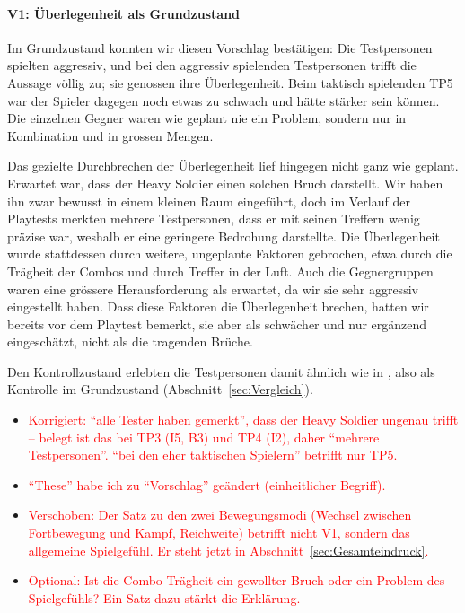 \documentclass[../Main.tex]{subfiles}
\begin{document}
\paragraph{V1: Überlegenheit als Grundzustand}
Im Grundzustand konnten wir diesen Vorschlag bestätigen: Die Testpersonen spielten aggressiv, und bei den aggressiv spielenden Testpersonen trifft die Aussage völlig zu; sie genossen ihre Überlegenheit. Beim taktisch spielenden TP5 war der Spieler dagegen noch etwas zu schwach und hätte stärker sein können. Die einzelnen Gegner waren wie geplant nie ein Problem, sondern nur in Kombination und in grossen Mengen.

Das gezielte Durchbrechen der Überlegenheit lief hingegen nicht ganz wie geplant. Erwartet war, dass der Heavy Soldier einen solchen Bruch darstellt. Wir haben ihn zwar bewusst in einem kleinen Raum eingeführt, doch im Verlauf der Playtests merkten mehrere Testpersonen, dass er mit seinen Treffern wenig präzise war, weshalb er eine geringere Bedrohung darstellte. Die Überlegenheit wurde stattdessen durch weitere, ungeplante Faktoren gebrochen, etwa durch die Trägheit der Combos und durch Treffer in der Luft. Auch die Gegnergruppen waren eine grössere Herausforderung als erwartet, da wir sie sehr aggressiv eingestellt haben. Dass diese Faktoren die Überlegenheit brechen, hatten wir bereits vor dem Playtest bemerkt, sie aber als schwächer und nur ergänzend eingeschätzt, nicht als die tragenden Brüche.

Den Kontrollzustand erlebten die Testpersonen damit ähnlich wie in , also als Kontrolle im Grundzustand (Abschnitt~\ref{sec:Vergleich}).

\begin{itemize}[leftmargin=1.5cm]
    \item \textcolor{red}{Korrigiert: \enquote{alle Tester haben gemerkt}, dass der Heavy Soldier ungenau trifft -- belegt ist das bei TP3 (I5, B3) und TP4 (I2), daher \enquote{mehrere Testpersonen}. \enquote{bei den eher taktischen Spielern} betrifft nur TP5.}
    \item \textcolor{red}{\enquote{These} habe ich zu \enquote{Vorschlag} geändert (einheitlicher Begriff).}
    \item \textcolor{red}{Verschoben: Der Satz zu den zwei Bewegungsmodi (Wechsel zwischen Fortbewegung und Kampf, Reichweite) betrifft nicht V1, sondern das allgemeine Spielgefühl. Er steht jetzt in Abschnitt~\ref{sec:Gesamteindruck}.}
    \item \textcolor{red}{Optional: Ist die Combo-Trägheit ein gewollter Bruch oder ein Problem des Spielgefühls? Ein Satz dazu stärkt die Erklärung.}
\end{itemize}
\end{document}

